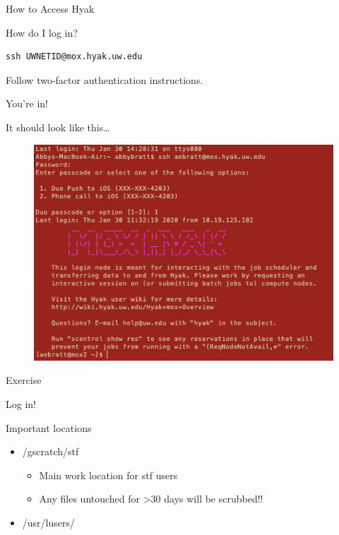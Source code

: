 \documentclass[ignorenonframetext,]{beamer}
\providecommand{\tightlist}{%
  \setlength{\itemsep}{0pt}\setlength{\parskip}{0pt}}
\begin{document}
\begin{frame}[fragile]{How to Access Hyak}
\begin{block}{How do I log in?}
\begin{verbatim}
ssh UWNETID@mox.hyak.uw.edu
\end{verbatim}

Follow two-factor authentication instructions.

You're in!

\end{block}

\begin{block}{It should look like this\ldots{}}

\begin{figure}
\centering
\includegraphics[width=6.25000in]{images/Hyak_successful_login.png}
\caption{}
\end{figure}

\end{block}

\begin{block}{Exercise}

Log in!

\end{block}

\begin{block}{Important locations}

\begin{itemize}[<+->]
\tightlist
\item
  /gscratch/stf

  \begin{itemize}[<+->]
  \tightlist
  \item
    Main work location for stf users
  \item
    Any files untouched for \textgreater{}30 days will be scrubbed!!
  \end{itemize}
\item
  /usr/lusers/


\end{itemize}
\end{block}
\end{frame}
\end{document}
